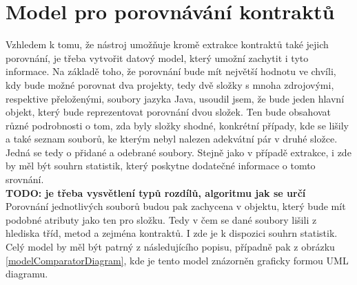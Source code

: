 	\section{Model pro porovnávání kontraktů}
		Vzhledem k tomu, že nástroj umožňuje kromě extrakce kontraktů také jejich porovnání, je třeba vytvořit datový model, který umožní zachytit i tyto informace. Na základě toho, že porovnání bude mít největší hodnotu ve chvíli, kdy bude možné porovnat dva projekty, tedy dvě složky s mnoha zdrojovými, respektive přeloženými, soubory jazyka Java, usoudil jsem, že bude jeden hlavní objekt, který bude reprezentovat porovnání dvou složek. Ten bude obsahovat různé podrobnosti o tom, zda byly složky shodné, konkrétní případy, kde se lišily a také seznam souborů, ke kterým nebyl nalezen adekvátní pár v druhé složce. Jedná se tedy o přidané a odebrané soubory. Stejně jako v případě extrakce, i zde by měl být souhrn statistik, který poskytne dodatečné informace o tomto srovnání.\\
		
		\textbf{\textcolor{pblue}{TODO: je třeba vysvětlení typů rozdílů, algoritmu jak se určí}}\\		
		
		Porovnání jednotlivých souborů budou pak zachycena v objektu, který bude mít podobné atributy jako ten pro složku. Tedy v čem se dané soubory lišili z hlediska tříd, metod a zejména kontraktů. I zde je k dispozici souhrn statistik. Celý model by měl být patrný z následujícího popisu, případně pak z obrázku \ref{modelComparatorDiagram}, kde je tento model znázorněn graficky formou UML diagramu.
		
